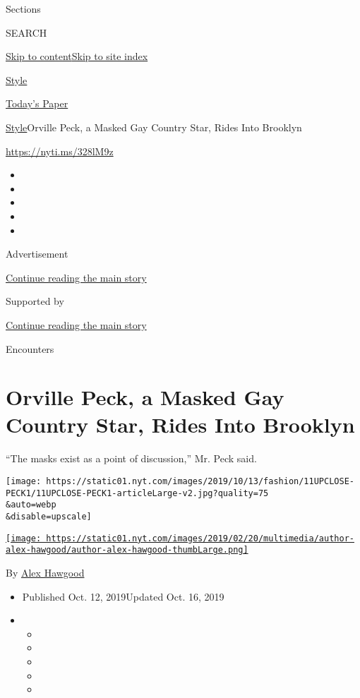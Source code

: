 Sections

SEARCH

\protect\hyperlink{site-content}{Skip to
content}\protect\hyperlink{site-index}{Skip to site index}

\href{https://www.nytimes.com/section/style}{Style}

\href{https://myaccount.nytimes.com/auth/login?response_type=cookie\&client_id=vi}{}

\href{https://www.nytimes.com/section/todayspaper}{Today's Paper}

\href{/section/style}{Style}\textbar{}Orville Peck, a Masked Gay Country
Star, Rides Into Brooklyn

\href{https://nyti.ms/328lM9z}{https://nyti.ms/328lM9z}

\begin{itemize}
\item
\item
\item
\item
\item
\end{itemize}

Advertisement

\protect\hyperlink{after-top}{Continue reading the main story}

Supported by

\protect\hyperlink{after-sponsor}{Continue reading the main story}

Encounters

\hypertarget{orville-peck-a-masked-gay-country-star-rides-into-brooklyn}{%
\section{Orville Peck, a Masked Gay Country Star, Rides Into
Brooklyn}\label{orville-peck-a-masked-gay-country-star-rides-into-brooklyn}}

``The masks exist as a point of discussion,'' Mr. Peck said.

\texttt{[image: https://static01.nyt.com/images/2019/10/13/fashion/11UPCLOSE-PECK1/11UPCLOSE-PECK1-articleLarge-v2.jpg?quality=75\\\&auto=webp\\\&disable=upscale]}

\href{https://www.nytimes.com/by/alex-hawgood}{\texttt{[image: https://static01.nyt.com/images/2019/02/20/multimedia/author-alex-hawgood/author-alex-hawgood-thumbLarge.png]}}

By \href{https://www.nytimes.com/by/alex-hawgood}{Alex Hawgood}

\begin{itemize}
\item
  Published Oct. 12, 2019Updated Oct. 16, 2019
\item
  \begin{itemize}
  \item
  \item
  \item
  \item
  \item
  \end{itemize}
\end{itemize}

